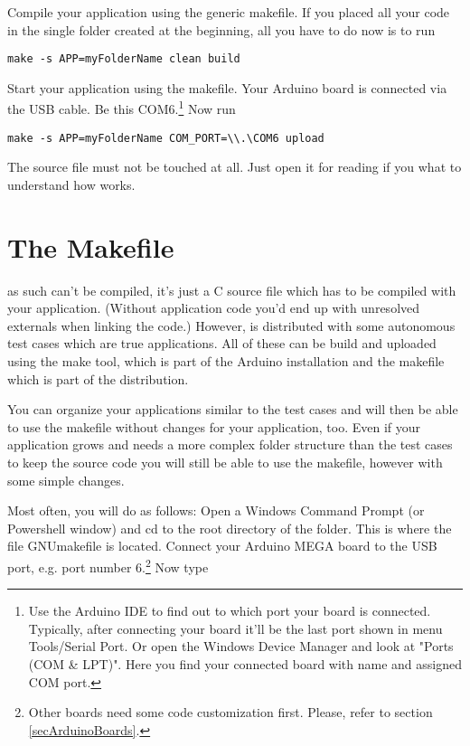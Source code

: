 Compile your application using the generic makefile. If you placed all
your code in the single folder created at the beginning, all you have to
do now is to run

\verb+make -s APP=myFolderName clean build+

Start your application using the makefile. Your Arduino board is connected
via the USB cable. Be this COM6.\footnote{Use the Arduino IDE to find out
to which port your board is connected. Typically, after connecting your board
it'll be the last port shown in menu Tools/Serial Port. Or open the
Windows Device Manager and look at "Ports (COM \& LPT)". Here you find your
connected board with name and assigned COM port.} Now run

\verb+make -s APP=myFolderName COM_PORT=\\.\COM6 upload+

The \rtos{} source file  must not be touched at all. Just open
it for reading if you what to understand how \rtos{} works.


\section{The Makefile}
\label{secMakefile}

\rtos{} as such can't be compiled, it's just a C source file which has to
be compiled with your application. (Without application code you'd end up
with unresolved externals when linking the code.) However, \rtos{} is
distributed with some autonomous test cases which are true \rtos{}
applications. All of these can be build and uploaded using the make tool,
which is part of the Arduino installation and the makefile which is part
of the \rtos{} distribution.

You can organize your applications similar to the test cases and will then
be able to use the makefile without changes for your application, too.
Even if your application grows and needs a more complex folder structure
than the test cases to keep the source code you will still be able to
use the makefile, however with some simple changes.

Most often, you will do as follows: Open a Windows Command Prompt (or
Powershell window) and cd to the root directory of the \rtos{} folder.
This is where the file GNUmakefile is located. Connect your Arduino MEGA
board to the USB port, e.g. port number 6.\footnote{Other boards need some
code customization first. Please, refer to section
\ref{secArduinoBoards}.} Now type

